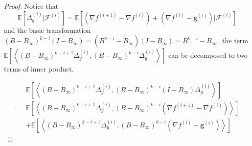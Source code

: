 \documentclass{article}
\newcommand{\vg}{{\mathbf{g}}}
\newcommand{\cF}{{\mathcal{F}}}
\newcommand{\EE}[1]{\mathbb{E}\left[#1\right]}
\newcommand{\ip}[1]{\left\langle#1\right\rangle}
\begin{document}
\begin{proof}

Notice that 
$$\EE{\Delta_{g}^{(i)}|\cF^{(i)}}=\EE{(\nabla f^{(i+1)}-\nabla f^{(i)})+(\nabla f^{(i)}-\vg^{(i)})|\cF^{(i)}}$$
and the basic transformation $(B-B_{\infty})^{k-i}(I-B_{\infty})=(B^{k-i}-B_{\infty})(I-B_{\infty})=B^{k-i}-B_{\infty},$
the term $\EE{\ip{(B-B_{\infty})^{k-i+1}\Delta_y^{(i)}, (B-B_{\infty})^{k-i}\Delta_g^{(i)}}}$ can be decomposed to two terms of inner product.

\begin{align*}
  &\EE{\ip{(B-B_{\infty})^{k-i+1}\Delta_y^{(i)}, (B-B_{\infty})^{k-i}(I-B_{\infty})\Delta_g^{(i)}}}\\
  =& \EE{\ip{(B-B_{\infty})^{k-i+1}\Delta_y^{(i)}, (B-B_{\infty})^{k-i}(\nabla f^{(i+1)}-\nabla f^{(i)})}}\\&+\EE{\ip{(B-B_{\infty})^{k-i+1}\Delta_y^{(i)}, (B-B_{\infty})^{k-i}(\nabla f^{(i)}-\vg^{(i)})}}
\end{align*}


\end{proof}
\end{document}
